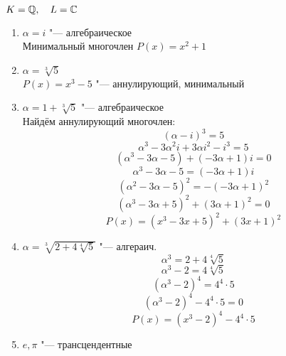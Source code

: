 \begin{egs}
	$ K = \mathbb{Q}, \quad L = \mathbb{C} $
	\begin{enumerate}
		\item $ \alpha = i $ "--- алгебраическое \\
		Минимальный многочлен $ P(x) = x^2 + 1 $
		\item $ \alpha = \sqrt[3]5 $ \\
		$ P(x) = x^3 - 5 $ "--- аннулирующий, минимальный
		\item $ \alpha = 1 + \sqrt[3]5 $ "--- алгебраическое \\
		Найдём аннулирующий многочлен:
		$$ (\alpha - i)^3 = 5 $$
		$$ \alpha^3 - 3\alpha^2i + 3\alpha i^2 - i^3 = 5 $$
		$$ (\alpha^3 - 3\alpha - 5) + (-3\alpha + 1)i = 0 $$
		$$ \alpha^3 - 3\alpha - 5 = (-3\alpha + 1)i $$
		$$ (\alpha^2 - 3\alpha - 5)^2 = -(-3\alpha + 1)^2 $$
		$$ (\alpha^3 - 3\alpha + 5)^2 + (3\alpha + 1)^2 = 0 $$
		$$ P(x) = (x^3 - 3x + 5)^2 + (3x + 1)^2 $$
		\item $ \alpha = \sqrt[3]{2 + 4\sqrt[4]5} $ "--- алгераич.
		$$ \alpha^3 = 2 + 4\sqrt[4]5 $$
		$$ \alpha^3 - 2 = 4\sqrt[4]5 $$
		$$ (\alpha^3 - 2)^4 = 4^4 \cdot 5 $$
		$$ (\alpha^3 - 2)^4 - 4^4 \cdot 5 = 0 $$
		$$ P(x) = (x^3 - 2)^4 - 4^4 \cdot 5 $$
		\item $ e, \pi $ "--- трансцендентные
	\end{enumerate}
\end{egs}

